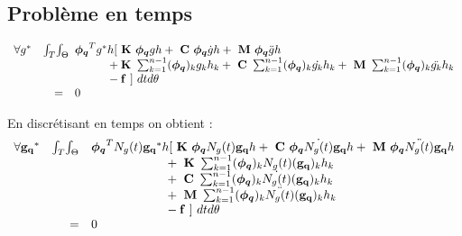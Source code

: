 \subsection*{Problème en temps}
\begin{equation}
\begin{array}{r r l}
	\forall g^*
	&\int_T \! \int_\Theta \!\!\!&		
		\boldsymbol{\phi_q}^Tg^*h [~\mathbf{K}~ \boldsymbol{\phi_q}gh
						+ ~\mathbf{C}~ \boldsymbol{\phi_q} \dot{g}h 
						+ ~\mathbf{M}~ \boldsymbol{\phi_q} \ddot{g}h
	\\
	  &&
		\phantom{\boldsymbol{\phi_q}g^*h
			}+ \mathbf{K}~ \sum_{k=1}^{n-1} (\boldsymbol{\phi_q})_k       g_k  h_k 
			+ ~\mathbf{C}~ \sum_{k=1}^{n-1} (\boldsymbol{\phi_q})_k  \dot{g_k} h_k 
			+ ~\mathbf{M}~ \sum_{k=1}^{n-1} (\boldsymbol{\phi_q})_k \ddot{g_k} h_k
	\\
	  &&
		\phantom{\boldsymbol{\phi_q}^*gh} -\mathbf{f}~] ~dt d\theta
	\\
	&= &0 
\end{array}
\end{equation}

\noindent
En discrétisant en temps on obtient :
\begin{equation}
\begin{array}{r r l}
	\forall \mathbf{g_q}^*
	&\int_T \! \int_\Theta&		
		\boldsymbol{\phi_q}^TN_g(t)\mathbf{g_q}^*h [~\mathbf{K}~ \boldsymbol{\phi_q}N_g(t)\mathbf{g_q}h
						+ ~\mathbf{C}~ \boldsymbol{\phi_q} \dot{N_g(t)}\mathbf{g_q}h 
						+ ~\mathbf{M}~ \boldsymbol{\phi_q} \ddot{N_g(t)}\mathbf{g_q}h
	\\
	  &&
		\phantom{\boldsymbol{\phi_q}N_g(t)\mathbf{g_q}^*h[
			}+~\mathbf{K}~ \sum_{k=1}^{n-1} (\boldsymbol{\phi_q})_k       N_g(t)(\mathbf{g_q})_k  h_k 
			\\ && \phantom{\boldsymbol{\phi_q}N_g(t)\mathbf{g_q}^*h[}
			+ ~\mathbf{C}~ \sum_{k=1}^{n-1} (\boldsymbol{\phi_q})_k  \dot{N_g(t)}(\mathbf{g_q})_k h_k 
			\\ && \phantom{\boldsymbol{\phi_q}N_g(t)\mathbf{g_q}^*h[}
			+ ~\mathbf{M}~ \sum_{k=1}^{n-1} (\boldsymbol{\phi_q})_k \ddot{N_g(t)}(\mathbf{g_q})_k h_k
	\\
	  &&
		 \phantom{\boldsymbol{\phi_q}N_g(t)\mathbf{g_q}^*h[} -\mathbf{f}~] ~dt d\theta
	\\
	&= &0 
\end{array}
\end{equation}


